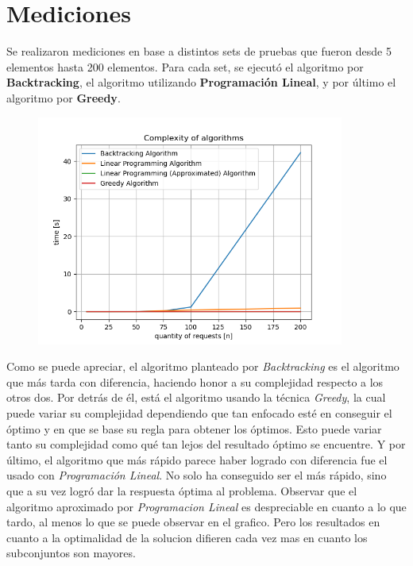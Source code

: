 \section{Mediciones}

Se realizaron mediciones en base a distintos sets de pruebas que fueron desde 5 elementos hasta 200 elementos. Para cada set, se ejecutó el algoritmo por \textbf{Backtracking}, el algoritmo utilizando \textbf{Programación Lineal}, y por último el algoritmo por \textbf{Greedy}.

\begin{figure}[H]
	\centering
	\includegraphics[width=0.9\textwidth]{img/graphic.png}
\end{figure}

Como se puede apreciar, el algoritmo planteado por \textit{Backtracking} es el algoritmo que más tarda con diferencia, haciendo honor a su complejidad respecto a los otros dos. Por detrás de él, está el algoritmo usando la técnica \textit{Greedy}, la cual puede variar su complejidad dependiendo que tan enfocado esté en conseguir el óptimo y en que se base su regla para obtener los óptimos. Esto puede variar tanto su complejidad como qué tan lejos del resultado óptimo se encuentre. Y por último, el algoritmo que más rápido parece haber logrado con diferencia fue el usado con \textit{Programación Lineal}. No solo ha conseguido ser el más rápido, sino que a su vez logró dar la respuesta óptima al problema. Observar que el algoritmo aproximado por \textit{Programacion Lineal} es despreciable en cuanto a lo que tardo, al menos lo que se puede observar en el grafico. Pero los resultados en cuanto a la optimalidad de la solucion difieren cada vez mas en cuanto los subconjuntos son mayores.


